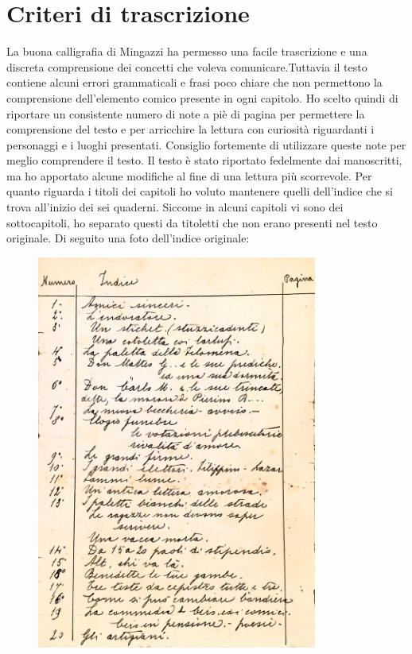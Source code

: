 \chapter*{Criteri di trascrizione}
La buona calligrafia di Mingazzi ha permesso una facile trascrizione e una discreta comprensione dei concetti che voleva comunicare.\:Tuttavia il testo contiene alcuni errori grammaticali e frasi poco chiare che non permettono la comprensione dell'elemento comico presente in ogni capitolo. Ho scelto quindi di riportare un consistente numero di note a piè di pagina per permettere la comprensione del testo e per arricchire la lettura con curiosità riguardanti i personaggi e i luoghi presentati. Consiglio fortemente di utilizzare queste note per meglio comprendere il testo. Il testo è stato riportato fedelmente dai manoscritti, ma ho apportato alcune modifiche al fine di una lettura più scorrevole. Per quanto riguarda i titoli dei capitoli ho voluto mantenere quelli dell'indice che si trova all'inizio dei sei quaderni. Siccome in alcuni capitoli vi sono dei sottocapitoli, ho separato questi da titoletti che non erano presenti nel testo originale. \newpage
\noindent Di seguito una foto dell'indice originale:\\
 \begin{figure}[htb]
    \centering
    \vspace{-0.7cm}
    \includegraphics[height=13cm]{indice}
\end{figure}
